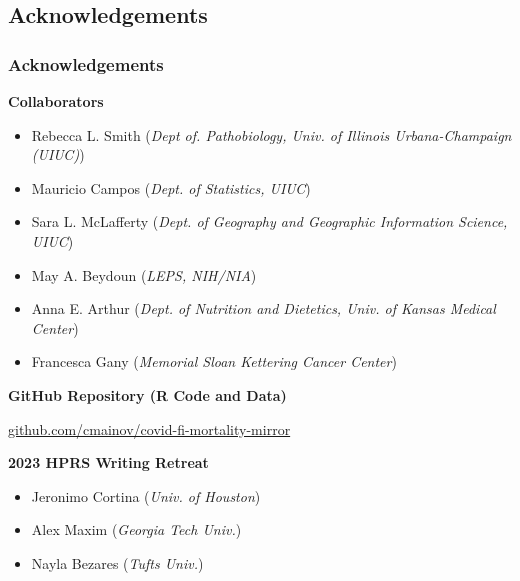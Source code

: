 \documentclass[aspectratio=169]{beamer}
\begin{document}
  \subsection{Acknowledgements}
\begin{frame}
	\frametitle{Acknowledgements}
	\vspace*{-0.3cm}
	\begin{multicols}{2} %
		
		\raggedright
	
		
		\textbf{Collaborators}
		
		\scriptsize{
			\begin{itemize}
				\item Rebecca L. Smith (\textit{Dept of. Pathobiology, Univ. of Illinois Urbana-Champaign (UIUC)})
				\item Mauricio Campos (\textit{Dept. of Statistics, UIUC})
				\item Sara L. McLafferty (\textit{Dept. of Geography and Geographic Information Science, UIUC})
				\item May A. Beydoun (\textit{LEPS, NIH/NIA})
				\item Anna E. Arthur (\textit{Dept. of Nutrition and Dietetics, Univ. of Kansas Medical Center})
				\item Francesca Gany (\textit{Memorial Sloan Kettering Cancer Center})
			
			\end{itemize}
		}
		
			\vspace{0.4cm}
			
			\scriptsize{
			\textbf{GitHub Repository (R Code and Data)}

\textcolor{blue}{\href{https://github.com/cmainov/covid-fi-mortality-mirror}{github.com/cmainov/covid-fi-mortality-mirror}}
		
		}
		\vfill\null
		\columnbreak
		
		
		\scriptsize{
			\textbf{2023 HPRS Writing Retreat}
			\begin{itemize}
				\item Jeronimo Cortina (\textit{Univ. of Houston})
				\item Alex Maxim (\textit{Georgia Tech Univ.})
				\item Nayla Bezares (\textit{Tufts Univ.})
			\end{itemize}
		}
		
		\vspace{0.1cm}
		

\end{multicols}
\end{frame}
\end{document}
